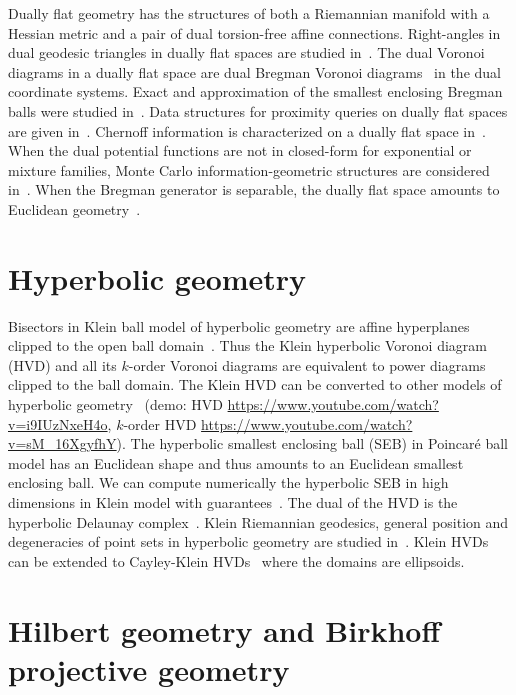 \documentclass[11pt]{article}
\begin{document}
Dually flat geometry has the structures of both a Riemannian manifold with a Hessian metric and a pair of dual torsion-free affine connections.
Right-angles in dual geodesic triangles in dually flat spaces are studied in~\cite{nielsen2021geodesic}.
The dual Voronoi diagrams in a dually flat space are dual Bregman Voronoi diagrams~\cite{boissonnat2010bregman} in the dual coordinate systems.
Exact and approximation of the smallest enclosing Bregman balls were studied in~\cite{nock2005fitting,nielsen2008smallest}.
Data structures for proximity queries on dually flat spaces are given in~\cite{nielsen2009tailored,nielsen2009bregman}.
Chernoff information is characterized on a dually flat space in~\cite{nielsen2013information,nielsen2013hypothesis}.
When the dual potential functions are not in closed-form for exponential or mixture families, Monte Carlo information-geometric structures are considered in~\cite{nielsen2019monte}.
When the Bregman generator is separable, the dually flat space amounts to Euclidean geometry~\cite{gomes2018geometry}.





\section*{Hyperbolic geometry}
Bisectors in Klein ball model of hyperbolic geometry are affine hyperplanes clipped to the open ball domain~\cite{nielsen2010hyperbolic}.
Thus the Klein hyperbolic Voronoi diagram (HVD) and all its $k$-order Voronoi diagrams are equivalent to  power diagrams clipped to the ball domain.
The Klein HVD can be converted to other models of hyperbolic geometry~\cite{nielsen2014visualizing} (demo: HVD \url{https://www.youtube.com/watch?v=i9IUzNxeH4o}, $k$-order HVD \url{https://www.youtube.com/watch?v=sM_16XgyfhY}). 
The hyperbolic smallest enclosing  ball (SEB) in Poincar\'e ball model has an Euclidean shape and thus amounts to an Euclidean smallest enclosing ball.
We can compute numerically the hyperbolic SEB in high dimensions in Klein model with guarantees~\cite{nielsen2015approximating}.
The dual of the HVD is the hyperbolic Delaunay complex~\cite{nielsen2020voronoi}. 
Klein Riemannian geodesics, general position and degeneracies of point sets in hyperbolic geometry are studied in~\cite{nielsen2014further}.
Klein HVDs can be extended to Cayley-Klein HVDs~\cite{nielsen2016classification} where the domains are ellipsoids.

\section*{Hilbert geometry and Birkhoff projective geometry}
\end{document}
